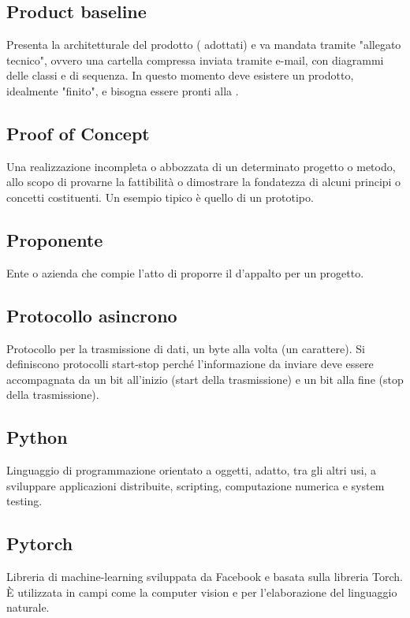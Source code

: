 \subsection*{Product baseline}
Presenta la  architetturale del prodotto ( adottati) e va mandata tramite "allegato tecnico", ovvero una cartella compressa inviata tramite e-mail, con diagrammi delle classi e di sequenza. In questo momento deve esistere un prodotto, idealmente "finito", e bisogna essere pronti alla .

\subsection*{Proof of Concept}
Una realizzazione incompleta o abbozzata di un determinato progetto o metodo, allo scopo di provarne la fattibilità o dimostrare la fondatezza di alcuni principi o concetti costituenti. Un esempio tipico è quello di un prototipo. 

\subsection*{Proponente}
Ente o azienda che compie l'atto di proporre il  d'appalto per un progetto.

\subsection*{Protocollo asincrono}
Protocollo per la trasmissione di dati, un byte alla volta (un carattere). Si definiscono protocolli start-stop perché l'informazione da inviare deve essere accompagnata da un bit all'inizio (start della trasmissione) e un bit alla fine (stop della trasmissione).

\subsection*{Python}
Linguaggio di programmazione orientato a oggetti, adatto, tra gli altri usi, a sviluppare applicazioni distribuite, scripting, computazione numerica e system testing.

\subsection*{Pytorch}
Libreria  di machine-learning sviluppata da Facebook e basata sulla libreria Torch. È utilizzata in campi come la computer vision e per l'elaborazione del linguaggio naturale.

